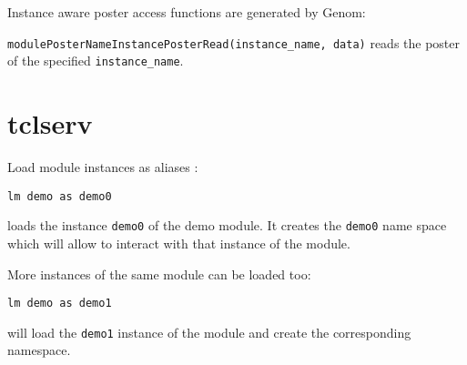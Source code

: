 Instance aware poster access functions are generated by Genom: 

\texttt{modulePosterNameInstancePosterRead(instance\_name, data)}
reads the poster of the specified \texttt{instance\_name}.

\section{tclserv}

Load module instances as aliases : 

\texttt{lm demo as demo0}

loads the instance \texttt{demo0} of the demo module. It creates the
\texttt{demo0} name space which will allow to interact with that
instance of the module. 

More instances of the same module can be loaded too: 

\texttt{lm demo as demo1}

will load the \texttt{demo1} instance of the module and create the
corresponding namespace.

